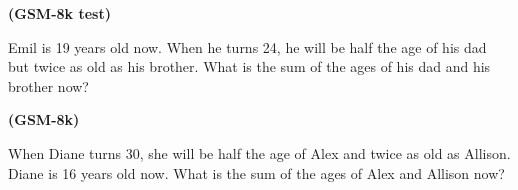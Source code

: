 






\begin{example}\label{ex:gsm-8k}

\textbf{(GSM-8k test)} \

Emil is 19 years old now. When he turns 24, he will be half the age of his dad but twice as old as his brother.  What is the sum of the ages of his dad and his brother now?


\textbf{(GSM-8k)}

When Diane turns 30, she will be half the age of Alex and twice as old as Allison. Diane is 16 years old now. What is the sum of the ages of Alex and Allison now?

\end{example}



